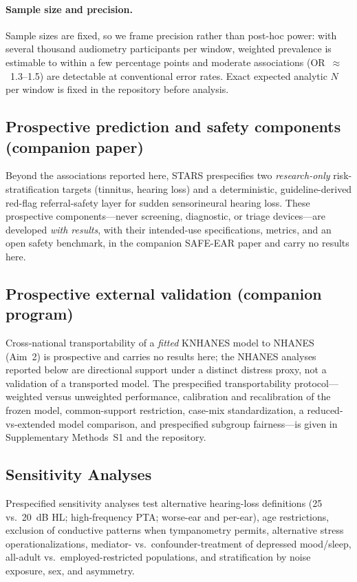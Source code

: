 \paragraph{Sample size and precision.} Sample sizes are fixed, so we frame precision rather than post-hoc power: with several thousand audiometry participants per window, weighted prevalence is estimable to within a few percentage points and moderate associations (OR~$\approx$~1.3--1.5) are detectable at conventional error rates. Exact expected analytic $N$ per window is fixed in the repository before analysis.

\subsection{Prospective prediction and safety components (companion paper)}
Beyond the associations reported here, STARS prespecifies two \emph{research-only} risk-stratification targets (tinnitus, hearing loss) and a deterministic, guideline-derived red-flag referral-safety layer for sudden sensorineural hearing loss. These prospective components---never screening, diagnostic, or triage devices---are developed \emph{with results}, with their intended-use specifications, metrics, and an open safety benchmark, in the companion SAFE-EAR paper and carry no results here.

\subsection{Prospective external validation (companion program)}
Cross-national transportability of a \emph{fitted} KNHANES model to NHANES (Aim~2)
is prospective and carries no results here; the NHANES analyses reported below are
directional support under a distinct distress proxy, not a validation of a
transported model. The prespecified transportability protocol---weighted versus
unweighted performance, calibration and recalibration of the frozen model,
common-support restriction, case-mix standardization, a reduced-vs-extended model
comparison, and prespecified subgroup fairness---is given in Supplementary
Methods~S1 and the repository.

\subsection{Sensitivity Analyses}
Prespecified sensitivity analyses test alternative hearing-loss definitions (25 vs.\ 20~dB HL; high-frequency PTA; worse-ear and per-ear), age restrictions, exclusion of conductive patterns when tympanometry permits, alternative stress operationalizations, mediator- vs.\ confounder-treatment of depressed mood/sleep, all-adult vs.\ employed-restricted populations, and stratification by noise exposure, sex, and asymmetry.

